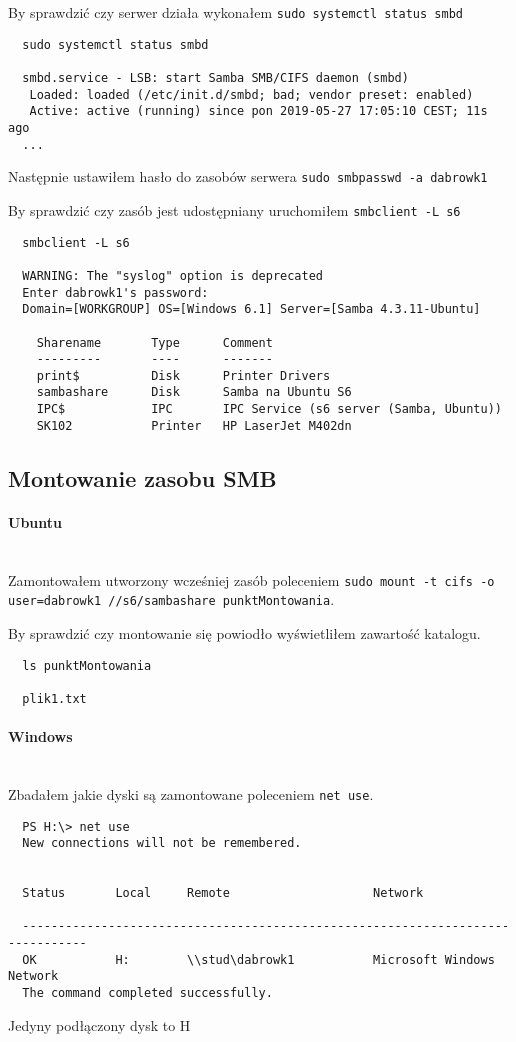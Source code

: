 \documentclass{article} %
\begin{document}
By sprawdzić czy serwer działa wykonałem \texttt{sudo systemctl status smbd}
\begin{verbatim}
  sudo systemctl status smbd

  smbd.service - LSB: start Samba SMB/CIFS daemon (smbd)
   Loaded: loaded (/etc/init.d/smbd; bad; vendor preset: enabled)
   Active: active (running) since pon 2019-05-27 17:05:10 CEST; 11s ago
  ...
\end{verbatim}

Następnie ustawiłem hasło do zasobów serwera \texttt{sudo smbpasswd -a dabrowk1}

By sprawdzić czy zasób jest udostępniany uruchomiłem \texttt{smbclient -L s6 }
\begin{verbatim}
  smbclient -L s6  

  WARNING: The "syslog" option is deprecated
  Enter dabrowk1's password: 
  Domain=[WORKGROUP] OS=[Windows 6.1] Server=[Samba 4.3.11-Ubuntu]

	Sharename       Type      Comment
	---------       ----      -------
	print$          Disk      Printer Drivers
	sambashare      Disk      Samba na Ubuntu S6
	IPC$            IPC       IPC Service (s6 server (Samba, Ubuntu))
	SK102           Printer   HP LaserJet M402dn
\end{verbatim}

\subsection{Montowanie zasobu SMB}
\paragraph{Ubuntu} \mbox{} \\
Zamontowałem utworzony wcześniej zasób poleceniem \texttt{sudo mount -t cifs -o user=dabrowk1 //s6/sambashare punktMontowania}.

By sprawdzić czy montowanie się powiodło wyświetliłem zawartość katalogu.
\begin{verbatim}
  ls punktMontowania 

  plik1.txt
\end{verbatim}

\paragraph{Windows} \mbox{} \\
Zbadałem jakie dyski są zamontowane poleceniem \texttt{net use}.
\begin{verbatim}
  PS H:\> net use
  New connections will not be remembered.


  Status       Local     Remote                    Network

  -------------------------------------------------------------------------------
  OK           H:        \\stud\dabrowk1           Microsoft Windows Network
  The command completed successfully.
\end{verbatim}
Jedyny podłączony dysk to H
\end{document}
